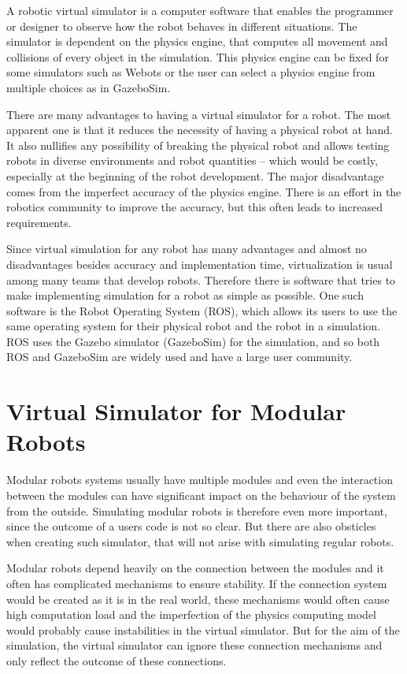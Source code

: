 \documentclass[
  digital, %
  table,   %
  oneside, %
  nolof,     %
  nolot,     %
]{fithesis3}
\begin{document}
A robotic virtual simulator is a computer software that enables the programmer or designer to observe how the robot behaves in different situations.
The simulator is dependent on the physics engine, that computes all movement and collisions of every object in the simulation.
This physics engine can be fixed for some simulators such as Webots\cite{webots} or the user can select a physics engine from multiple choices as in GazeboSim\cite{gazebo}.

There are many advantages to having a virtual simulator for a robot.
The most apparent one is that it reduces the necessity of having a physical robot at hand.
It also nullifies any possibility of breaking the physical robot and allows testing robots in diverse environments and robot quantities -- which would be costly, especially at the beginning of the robot development.
The major disadvantage comes from the imperfect accuracy of the physics engine. There is an effort in the robotics community to improve the accuracy, but this often leads to increased requirements.

Since virtual simulation for any robot has many advantages and almost no disadvantages besides accuracy and implementation time, virtualization is usual among many teams that develop robots.
Therefore there is software that tries to make implementing simulation for a robot as simple as possible.
One such software is the Robot Operating System (ROS), which allows its users to use the same operating system for their physical robot and the robot in a simulation.
ROS uses the Gazebo simulator (GazeboSim) for the simulation, and so both ROS and GazeboSim are widely used and have a large user community.

\section{Virtual Simulator for Modular Robots}

Modular robots systems usually have multiple modules and even the interaction between the modules can have significant impact on the behaviour of the system from the outside.
Simulating modular robots is therefore even more important, since the outcome of a users code is not so clear.
But there are also obsticles when creating such simulator, that will not arise with simulating regular robots.

Modular robots depend heavily on the connection between the modules and it often has complicated mechanisms to ensure stability.
If the connection system would be created as it is in the real world, these mechanisms would often cause high computation load and the imperfection of the physics computing model would probably cause instabilities in the virtual simulator.
But for the aim of the simulation, the virtual simulator can ignore these connection mechanisms and only reflect the outcome of these connections.
\end{document}
